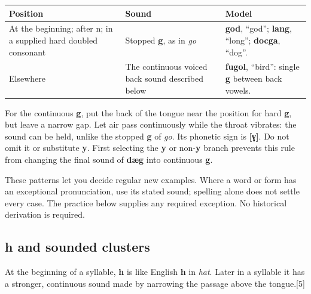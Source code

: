 \par\begingroup
\fontsize{10.5}{13.2}\selectfont
\setlength{\LTleft}{0pt}\setlength{\LTright}{\fill}
\noindent
\begin{tabular}{@{}>{\raggedright\arraybackslash}p{47.364mm}>{\raggedright\arraybackslash}p{37.919mm}>{\raggedright\arraybackslash}p{33.092mm}@{}}
\toprule
\textbf{Position} & \textbf{Sound} & \textbf{Model} \\
\midrule
At the beginning; after n; in a supplied hard doubled consonant & Stopped \textbf{g}, as in \emph{go} & \textbf{god}, “god”; \textbf{lang}, “long”; \textbf{docga}, “dog”. \\
Elsewhere & The continuous voiced back sound described below & \textbf{fugol}, “bird”: single \textbf{g} between back vowels. \\
\bottomrule
\end{tabular}
\par\endgroup

For the continuous \textbf{g}, put the back of the tongue near the position for hard \textbf{g}, but leave a narrow gap. Let air pass continuously while the throat vibrates: the sound can be held, unlike the stopped \textbf{g} of \emph{go}. Its phonetic sign is \textbf{[ɣ]}. Do not omit it or substitute \textbf{y}. First selecting the \textbf{y} or non-\textbf{y} branch prevents this rule from changing the final sound of \textbf{dæg} into continuous \textbf{g}.

These patterns let you decide regular new examples. Where a word or form has an exceptional pronunciation, use its stated sound; spelling alone does not settle every case. The practice below supplies any required exception. No historical derivation is required.

\subsection*{h and sounded clusters}

At the beginning of a syllable, \textbf{h} is like English \textbf{h} in \emph{hat}. Later in a syllable it has a stronger, continuous sound made by narrowing the passage above the tongue.[5]

